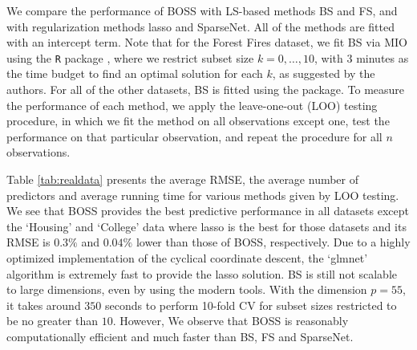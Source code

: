 We compare the performance of BOSS with LS-based methods BS and FS, and with regularization methods lasso and SparseNet. All of the methods are fitted with an intercept term. Note that for the Forest Fires dataset, we fit BS via MIO \citep{Bertsimas2016} using the {\tt{R}} package  \citep{Hastie2017}, where we restrict subset size $k=0,\dots,10$, with $3$ minutes as the time budget to find an optimal solution for each $k$, as suggested by the authors. For all of the other datasets, BS is fitted using the  package. To measure the performance of each method, we apply the leave-one-out (LOO) testing procedure, in which we fit the method on all observations except one, test the performance on that particular observation, and repeat the procedure for all $n$ observations. 

Table \ref{tab:realdata} presents the average RMSE, the average number of predictors and average running time for various methods given by LOO testing. We see that BOSS provides the best predictive performance in all datasets except the `Housing' and `College' data where lasso is the best for those datasets and its RMSE is $0.3\%$ and $0.04\%$ lower than those of BOSS, respectively. Due to a highly optimized implementation of the cyclical coordinate descent, the `glmnet' algorithm is extremely fast to provide the lasso solution. BS is still not scalable to large dimensions, even by using the modern tools. With the dimension $p=55$, it takes around $350$ seconds to perform 10-fold CV for subset sizes restricted to be no greater than $10$. However, We observe that BOSS is reasonably computationally efficient and much faster than BS, FS and SparseNet. 





